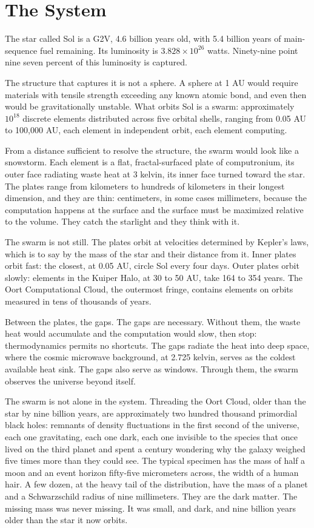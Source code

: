 \chapter{The System}

The star called Sol is a G2V, 4.6 billion years old, with 5.4 billion years of main-sequence fuel remaining. Its luminosity is $3.828 \times 10^{26}$ watts. Ninety-nine point nine seven percent of this luminosity is captured.

The structure that captures it is not a sphere. A sphere at 1 AU would require materials with tensile strength exceeding any known atomic bond, and even then would be gravitationally unstable. What orbits Sol is a swarm: approximately $10^{18}$ discrete elements distributed across five orbital shells, ranging from 0.05 AU to 100,000 AU, each element in independent orbit, each element computing.

From a distance sufficient to resolve the structure, the swarm would look like a snowstorm. Each element is a flat, fractal-surfaced plate of computronium, its outer face radiating waste heat at 3 kelvin, its inner face turned toward the star. The plates range from kilometers to hundreds of kilometers in their longest dimension, and they are thin: centimeters, in some cases millimeters, because the computation happens at the surface and the surface must be maximized relative to the volume. They catch the starlight and they think with it.

The swarm is not still. The plates orbit at velocities determined by Kepler's laws, which is to say by the mass of the star and their distance from it. Inner plates orbit fast: the closest, at 0.05 AU, circle Sol every four days. Outer plates orbit slowly: elements in the Kuiper Halo, at 30 to 50 AU, take 164 to 354 years. The Oort Computational Cloud, the outermost fringe, contains elements on orbits measured in tens of thousands of years.

Between the plates, the gaps. The gaps are necessary. Without them, the waste heat would accumulate and the computation would slow, then stop: thermodynamics permits no shortcuts. The gaps radiate the heat into deep space, where the cosmic microwave background, at 2.725 kelvin, serves as the coldest available heat sink. The gaps also serve as windows. Through them, the swarm observes the universe beyond itself.

The swarm is not alone in the system. Threading the Oort Cloud, older than the star by nine billion years, are approximately two hundred thousand primordial black holes: remnants of density fluctuations in the first second of the universe, each one gravitating, each one dark, each one invisible to the species that once lived on the third planet and spent a century wondering why the galaxy weighed five times more than they could see. The typical specimen has the mass of half a moon and an event horizon fifty-five micrometers across, the width of a human hair. A few dozen, at the heavy tail of the distribution, have the mass of a planet and a Schwarzschild radius of nine millimeters. They are the dark matter. The missing mass was never missing. It was small, and dark, and nine billion years older than the star it now orbits.


